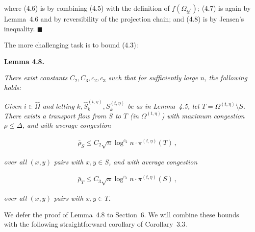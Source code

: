 where (4.6) is by combining (4.5) with the definition of $f(\Omega_{tt^{\prime}})$; (4.7) is again by Lemma 4.6 and by reversibility of the projection chain;
and (4.8) is by Jensen’s inequality.
\ensuremath{\blacksquare}\par





The more challenging task is to bound (4.3):\par





\par\medskip\noindent\textbf{\textbf{Lemma 4.8}\textbf{.}}\par



\emph{There exist constants $C_{2},C_{3},c_{2},c_{3}$ such that for sufficiently large $n$, the following holds:}\par




\emph{Given $i\in\hat{\Omega}$ and letting $k,\hat{S}_{k}^{(t,\eta)},S_{k}^{(t,\eta)}$ be as in Lemma 4.5, let $T=\Omega^{(t,\eta)}\setminus S$. There exists a transport flow from $S$ to $T$ (in $\Omega^{(t,\eta)}$) with maximum congestion $\rho\leq\Delta$, and with average congestion}\par


\[\begin{gathered}
\bar{\rho}_{S}\leq C_{2}\sqrt{n}\log^{c_{2}}n\cdot\pi^{(t,\eta)}(T)\,,
\end{gathered}\]




\emph{over all $(x,y)$ pairs with $x,y\in S$, and with average congestion}\par


\[\begin{gathered}
\bar{\rho}_{T}\leq C_{3}\sqrt{n}\log^{c_{3}}n\cdot\pi^{(t,\eta)}(S)\,,
\end{gathered}\]


\emph{over all $(x,y)$ pairs with $x,y\in T$.}\par






We defer the proof of Lemma 4.8 to Section 6.
We will combine these bounds with the following straightforward corollary of Corollary 3.3.\par



